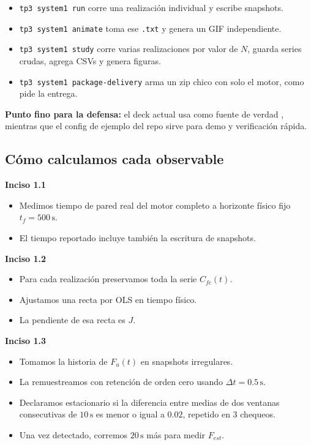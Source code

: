 \documentclass[11pt]{article}
\newcommand{\sectionbox}[1]{
  \vspace{0.4em}
  {\colorbox{tplight}{\parbox{\dimexpr\linewidth-2\fboxsep\relax}{\textbf{\color{tpblue}#1}}}}
  \vspace{0.35em}
}
\begin{document}
\begin{itemize}
  \item \texttt{tp3 system1 run} corre una realizaci\'on individual y escribe snapshots.
  \item \texttt{tp3 system1 animate} toma ese \texttt{.txt} y genera un GIF independiente.
  \item \texttt{tp3 system1 study} corre varias realizaciones por valor de $N$, guarda series crudas, agrega CSVs y genera figuras.
  \item \texttt{tp3 system1 package-delivery} arma un zip chico con solo el motor, como pide la entrega.
\end{itemize}

\textbf{Punto fino para la defensa:} el deck actual usa como fuente de verdad , mientras que el config de ejemplo del repo sirve para demo y verificaci\'on r\'apida.

\subsection{C\'omo calculamos cada observable}

\sectionbox{Inciso 1.1}
\begin{itemize}
  \item Medimos tiempo de pared real del motor completo a horizonte f\'isico fijo $t_f=500\,\mathrm{s}$.
  \item El tiempo reportado incluye tambi\'en la escritura de snapshots.
\end{itemize}

\sectionbox{Inciso 1.2}
\begin{itemize}
  \item Para cada realizaci\'on preservamos toda la serie $C_{fc}(t)$.
  \item Ajustamos una recta por OLS en tiempo f\'isico.
  \item La pendiente de esa recta es $J$.
\end{itemize}

\sectionbox{Inciso 1.3}
\begin{itemize}
  \item Tomamos la historia de $F_u(t)$ en snapshots irregulares.
  \item La remuestreamos con retenci\'on de orden cero usando $\Delta t = 0.5\,\mathrm{s}$.
  \item Declaramos estacionario si la diferencia entre medias de dos ventanas consecutivas de $10\,\mathrm{s}$ es menor o igual a $0.02$, repetido en 3 chequeos.
  \item Una vez detectado, corremos $20\,\mathrm{s}$ m\'as para medir $F_{est}$.
\end{itemize}
\end{document}
